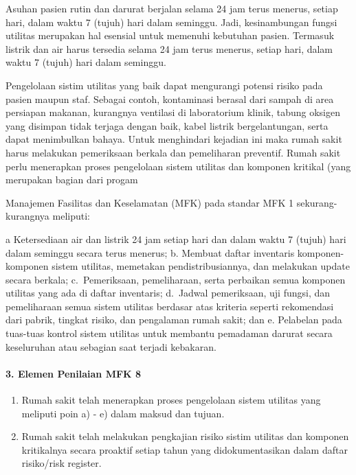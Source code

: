 \documentclass[
]{book}
\providecommand{\tightlist}{%
  \setlength{\itemsep}{0pt}\setlength{\parskip}{0pt}}
\begin{document}
Asuhan pasien rutin dan darurat berjalan selama 24 jam terus menerus, setiap hari, dalam waktu 7 (tujuh) hari dalam seminggu. Jadi, kesinambungan fungsi utilitas merupakan hal esensial untuk memenuhi kebutuhan pasien. Termasuk listrik dan air harus tersedia selama 24 jam terus menerus, setiap hari, dalam waktu 7 (tujuh) hari dalam seminggu.

Pengelolaan sistim utilitas yang baik dapat mengurangi potensi risiko pada pasien maupun staf. Sebagai contoh, kontaminasi berasal dari sampah di area persiapan makanan, kurangnya ventilasi di laboratorium klinik, tabung oksigen yang disimpan tidak terjaga dengan baik, kabel listrik bergelantungan, serta dapat menimbulkan bahaya. Untuk menghindari kejadian ini maka rumah sakit harus melakukan pemeriksaan berkala dan pemeliharan preventif.
Rumah sakit perlu menerapkan proses pengelolaan sistem utilitas dan komponen kritikal (yang merupakan bagian dari progam

Manajemen Fasilitas dan Keselamatan (MFK) pada standar MFK 1 sekurang- kurangnya meliputi:

a Ketersediaan air dan listrik 24 jam setiap hari dan dalam waktu 7 (tujuh) hari dalam seminggu secara terus menerus;
b. Membuat daftar inventaris komponen-komponen sistem utilitas, memetakan pendistribusiannya, dan melakukan update secara berkala;
c.~Pemeriksaan, pemeliharaan, serta perbaikan semua komponen utilitas yang ada di daftar inventaris;
d.~Jadwal pemeriksaan, uji fungsi, dan pemeliharaan semua sistem utilitas berdasar atas kriteria seperti rekomendasi dari pabrik, tingkat risiko, dan pengalaman rumah sakit; dan
e. Pelabelan pada tuas-tuas kontrol sistem utilitas untuk membantu pemadaman darurat secara keseluruhan atau sebagian saat terjadi kebakaran.

\hypertarget{elemen-penilaian-mfk-8}{%
\paragraph*{3. Elemen Penilaian MFK 8}\label{elemen-penilaian-mfk-8}}

\begin{enumerate}
\def\labelenumi{\alph{enumi}.}
\tightlist
\item
  Rumah sakit telah menerapkan proses pengelolaan sistem utilitas yang meliputi poin a) - e) dalam maksud dan tujuan.
\item
  Rumah sakit telah melakukan pengkajian risiko sistim utilitas dan komponen kritikalnya secara proaktif setiap tahun yang didokumentasikan dalam daftar risiko/risk register.
\end{enumerate}
\end{document}
